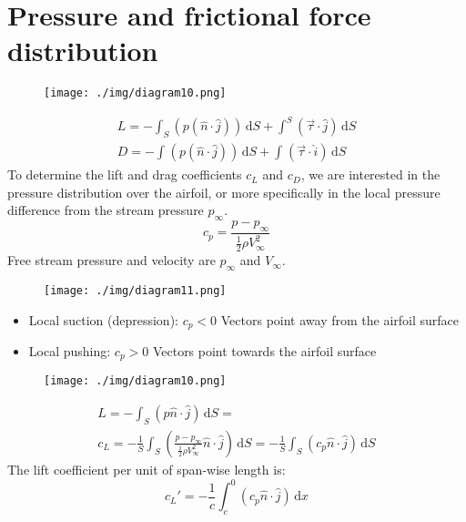 \section{Pressure and frictional force distribution}
\begin{figure}[H]
  \centering
  \texttt{[image: ./img/diagram10.png]}
\end{figure}
\begin{gather}
  L = - \int_{S}^{} \left( p (\hat{n}\cdot \hat{j}) \right)  \,\mathrm{d}S + \int_{}^{S} \left( \vec{\tau} \cdot \hat{j} \right)  \,\mathrm{d}S\\
  D = - \int_{}^{} \left(  p (\hat{n} \cdot \hat{j})\right)  \,\mathrm{d}S  + \int_{}^{} \left(\vec{\tau} \cdot \hat{i} \right)  \,\mathrm{d}S
\end{gather}
To determine the lift and drag coefficients $c_L$ and $c_D$, we are interested in the pressure distribution over the airfoil, or more specifically in the local pressure difference from the stream pressure $p_{\infty}$.
\begin{equation}
  c_p = \frac{p - p_{\infty}}{\frac{1}{2} \rho V_{\infty}^2}
\end{equation}
Free stream pressure and velocity are $p_\infty$ and $V_\infty$.
\begin{figure}[H]
  \centering
  \texttt{[image: ./img/diagram11.png]}
\end{figure}
\begin{itemize}
  \item Local suction (depression): $c_p < 0$ Vectors point away from the airfoil surface
  \item Local pushing: $c_p > 0$ Vectors point towards the airfoil surface
\end{itemize}
\begin{figure}[H]
  \centering
  \texttt{[image: ./img/diagram10.png]}
\end{figure}
\begin{gather}
  L = - \int_{S}^{} \left(p\hat{n}\cdot \hat{j}\right)  \,\mathrm{d}S = \\
  c_L = - \frac{1}{S} \int_{S}^{} \left( \frac{p - p_{\infty}}{\frac{1}{2} \rho V_{\infty}^2} \hat{n} \cdot \hat{j} \right) \,\mathrm{d}S = -\frac{1}{S} \int_{S}^{} \left( c_p \hat{n} \cdot \hat{j} \right)  \,\mathrm{d}S
\end{gather}
The lift coefficient per unit of span-wise length is:
\begin{equation}
  c_L' = - \frac{1}{c}\int_{c}^{0} \left( c_p \hat{n}\cdot\hat{j} \right)  \,\mathrm{d}x
\end{equation}
